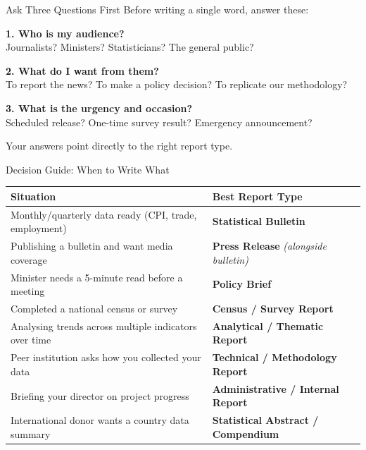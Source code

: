 \documentclass[xcolor={table,dvipsnames},aspectratio=169,11pt]{beamer}
\begin{document}
\begin{frame}{Ask Three Questions First}
    Before writing a single word, answer these:
    \vskip 0.4cm
    \begin{blockquote}
        \textbf{1. Who is my audience?} \\
        \small Journalists? Ministers? Statisticians? The general public?
    \end{blockquote}
    \begin{blockquote}
        \textbf{2. What do I want from them?} \\
        \small To report the news? To make a policy decision? To replicate our methodology?
    \end{blockquote}
    \begin{blockquote}
        \textbf{3. What is the urgency and occasion?} \\
        \small Scheduled release? One-time survey result? Emergency announcement?
    \end{blockquote}
    \vskip 0.2cm
    Your answers point directly to the right report type.
\end{frame}

\begin{frame}{Decision Guide: When to Write What}
    \footnotesize
    \begin{tabular}{l>{\raggedright\arraybackslash}p{6.5cm}}
    \toprule
    \rowcolor{nsoBlue}\color{white}\bfseries Situation & \color{white}\bfseries Best Report Type \\
    \midrule
    Monthly/quarterly data ready (CPI, trade, employment) & \textbf{Statistical Bulletin} \\
    Publishing a bulletin and want media coverage & \textbf{Press Release} \textit{(alongside bulletin)} \\
    Minister needs a 5-minute read before a meeting & \textbf{Policy Brief} \\
    Completed a national census or survey & \textbf{Census / Survey Report} \\
    Analysing trends across multiple indicators over time & \textbf{Analytical / Thematic Report} \\
    Peer institution asks how you collected your data & \textbf{Technical / Methodology Report} \\
    Briefing your director on project progress & \textbf{Administrative / Internal Report} \\
    International donor wants a country data summary & \textbf{Statistical Abstract / Compendium} \\
    \bottomrule
    \end{tabular}
\end{frame}
\end{document}
